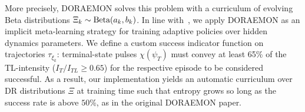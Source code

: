 More precisely, DORAEMON solves this problem with a curriculum of evolving Beta distributions \( \Xi_k \sim \text{Beta}(a_k, b_k) \).
In line with~\citet{tiboni2023domain}, we apply DORAEMON as an implicit meta-learning strategy for training adaptive policies over hidden dynamics parameters. We define a custom success indicator function on trajectories \( \tau_{\xi_k} \): terminal-state pulses \( \chi(\psi_T) \) must convey at least 65\% of the TL-intensity (\( I_T / I_{TL} \geq 0.65 \)) for the respective episode to be considered successful.
As a result, our implementation yields an automatic curriculum over DR distributions \( \Xi \) at training time such that entropy grows so long as the success rate is above \( 50 \)\%, as in the original DORAEMON paper.